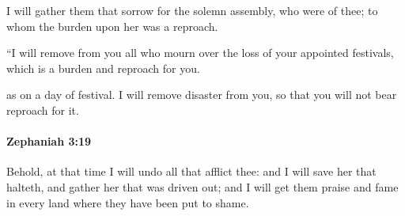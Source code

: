 			\begin{versebox}
					\item[BHS] 
					\item[LXX] 
					\item[ASV] I will gather them that sorrow for the solemn assembly, who were of thee; to whom the burden upon her was a reproach.
					\item[NIV] “I will remove from you all who mourn over the loss of your appointed festivals, which is a burden and reproach for you.
					\item[NRSV] as on a day of festival. I will remove disaster from you, so that you will not bear reproach for it.
			\end{versebox}

		\paragraph{Zephaniah 3:19} %
			\label{ZEPHANIAH-3-19}

			Behold, at that time I will undo all that afflict thee: and I will save her that halteth, and gather her that was driven out; and I will get them praise and fame in every land where they have been put to shame.

